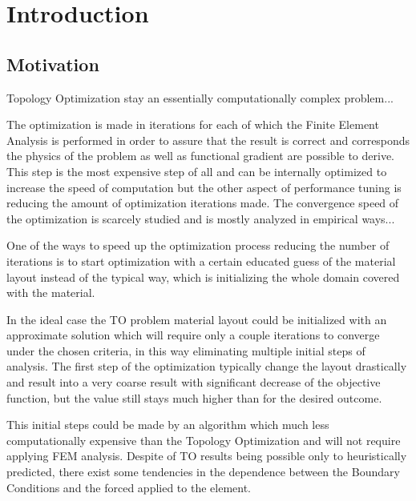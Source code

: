 
\chapter{Introduction}
\label{chapter:Introduction}


\section{Motivation}

Topology Optimization stay an essentially computationally complex problem...
\bigskip

The optimization is made in iterations for each of which the Finite Element Analysis is performed in order to assure that the result is correct and corresponds the physics of the problem as well as functional gradient are possible to derive.
This step is the most expensive step of all and can be internally optimized to increase the speed of computation but the other aspect of performance tuning is reducing the amount of optimization iterations made.
The convergence speed of the optimization is scarcely studied and is mostly analyzed in empirical ways...
\bigskip

One of the ways to speed up the optimization process reducing the number of iterations is to start optimization with a certain educated guess of the material layout instead of the typical way, which is initializing the whole domain covered with the material.
\bigskip

In the ideal case the TO problem material layout could be initialized with an approximate solution which will require only a couple iterations to converge under the chosen criteria, in this way eliminating multiple initial steps  of analysis.
The first step of the optimization typically change the layout drastically and result into a very coarse result with significant decrease of the objective function, but the value still stays much higher than for the desired outcome. 
\bigskip
{}

This initial steps could be made by an algorithm which much less computationally expensive than the Topology Optimization and will not require applying FEM analysis. 
Despite of TO results being possible only to heuristically predicted, there exist some tendencies in the dependence between the Boundary Conditions and the forced applied to the element. 
\bigskip

